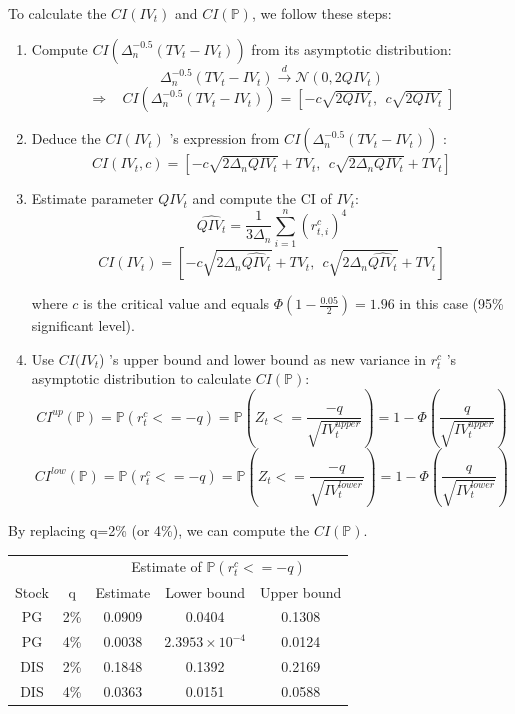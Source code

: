 \documentclass[12pt,letterpaper]{article}
\begin{document}
\begin{enumerate}[label=\textbf{(\Alph*)}]
 To calculate the $CI(IV_{t})$ and $CI(\mathbb{P})$, we follow these steps:
 \begin{enumerate}[label=(\roman*)]
 \item Compute $CI(\Delta_n^{-0.5}(TV_t-IV_t))$ from its asymptotic distribution:
 $$\Delta_n^{-0.5}(TV_t-IV_t) \xrightarrow{d}  \mathcal{N}(0,2QIV_t)$$
 $$\Rightarrow  ~~~~CI(\Delta_n^{-0.5}(TV_t-IV_t))=[-c\sqrt{2QIV_t},~~ c\sqrt{2QIV_t}~]$$
 \item Deduce the $CI(IV_t)$ 's expression from $CI(\Delta_n^{-0.5}(TV_t-IV_t))$  :
$$CI(IV_t,c)=[-c\sqrt{2\Delta_n QIV_t}+TV_t, ~~c\sqrt{2\Delta_n QIV_t}+TV_t ]$$
 
\item Estimate parameter $QIV_t$ and compute the CI of $IV_t$:
\vspace{-1mm}
 $$\hat{QIV_t}=\frac{1}{3 \Delta_n}\sum_{i=1}^{n}(r_{t,i}^c)^4$$
 \vspace{-1mm}
 $$CI(IV_t)=[-c\sqrt{2\Delta_n\hat{QIV_t}}+TV_t,~~ c\sqrt{2\Delta_n\hat{QIV_t}}+TV_t ]$$
 
 where $c$ is the critical value and equals $\Phi(1-\frac{0.05}{2})=1.96$ in this case (95\% significant level).

\item Use $CI(IV_t$) 's upper bound and lower bound as new variance in $r_t^c$ 's asymptotic distribution to calculate $CI(\mathbb{P})$:
$$CI^{up}(\mathbb{P})=\mathbb{P}(r_t^c <= -q)=\mathbb{P}(Z_t<=\frac{-q}{\sqrt{IV_t^{upper}}})=1-\Phi(\frac{q}{\sqrt{IV_t^{upper}}})$$
\vspace{-3mm}
$$CI^{low}(\mathbb{P})=\mathbb{P}(r_t^c <= -q)=\mathbb{P}(Z_t<=\frac{-q}{\sqrt{IV_t^{lower}}})=1-\Phi(\frac{q}{\sqrt{IV_t^{lower}}})$$
 \end{enumerate}
By replacing q=2\% (or 4\%), we can compute the $CI(\mathbb{P})$.
\newpage

\begin{table}[ht]
\centering %
\begin{tabular}{c c c c c} %
\hline\hline %
& & \multicolumn{3}{c}{Estimate of $\mathbb{P}(r_t^c <= -q)$}\\ [0.5ex]%
\cline{3-5} Stock & q & Estimate & Lower bound & Upper bound\\ 
 \hline
PG & 2\% & 0.0909 & 0.0404 & 0.1308 \\ %
PG & 4\% & 0.0038 & $2.3953\times 10^{-4}$ & 0.0124 \\ %
DIS & 2\% & 0.1848 & 0.1392& 0.2169 \\ %
DIS & 4\% & 0.0363 & 0.0151 & 0.0588 \\
\hline %
\end{tabular}
\end{table}


\end{enumerate}
\end{document}
